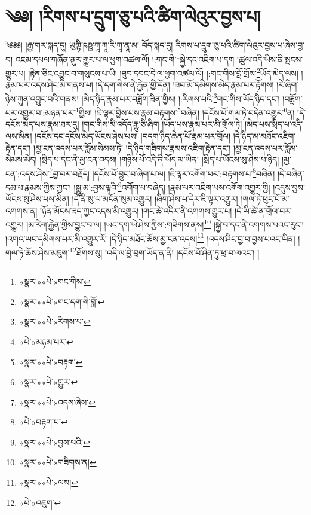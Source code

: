 \chapter{༄༅། །རིགས་པ་དྲུག་ཅུ་པའི་ཚིག་ལེའུར་བྱས་པ།}༄༅༅། །རྒྱ་གར་སྐད་དུ། ཡུགྟི་ཥཥྛ་ཀཱ་ཀཱ་རི་ཀཱ་ནཱ་མ། བོད་སྐད་དུ། རིགས་པ་དྲུག་ཅུ་པའི་ཚིག་ལེའུར་བྱས་པ་ཞེས་བྱ་བ། འཇམ་དཔལ་གཞོན་ནུར་གྱུར་པ་ལ་ཕྱག་འཚལ་ལོ། །:གང་གི་\footnote{«སྣར་»«པེ་»གང་གིས་}སྐྱེ་དང་འཇིག་པ་དག །ཚུལ་འདི་ཡིས་ནི་སྤངས་གྱུར་པ། །རྟེན་ཅིང་འབྱུང་བ་གསུངས་པ་ཡི། །ཐུབ་དབང་དེ་ལ་ཕྱག་འཚལ་ལོ། །:གང་གིས་བློ་གྲོས་\footnote{«སྣར་»«པེ་»གང་དག་གི་བློ་}ཡོད་མེད་ལས། །རྣམ་པར་འདས་ཤིང་མི་གནས་པ། །དེ་དག་གིས་ནི་རྐྱེན་གྱི་དོན། །ཟབ་མོ་དམིགས་མེད་རྣམ་པར་རྟོགས། །རེ་ཞིག་ཉེས་ཀུན་འབྱུང་བའི་གནས། །མེད་ཉིད་རྣམ་པར་བཟློག་ཟིན་གྱིས། །:རིགས་པའི་\footnote{«སྣར་»«པེ་»རིགས་པ་}གང་གིས་ཡོད་ཉིད་དང་། །བཟློག་པར་འགྱུར་བ་:མཉན་པར་\footnote{«པེ་»མཉམ་པར་}གྱིས། །ཇི་ལྟར་བྱིས་པས་རྣམ་བརྟགས་\footnote{«སྣར་»«པེ་»བརྟག་}བཞིན། །དངོས་པོ་གལ་ཏེ་བདེན་འགྱུར་\footnote{«སྣར་»«པེ་»གྱུར་}ན། །དེ་དངོས་མེད་པས་རྣམ་ཐར་དུ། །གང་གིས་མི་འདོད་རྒྱུ་ཅི་ཞིག །ཡོད་པས་རྣམ་པར་མི་གྲོལ་ཏེ། །མེད་པས་སྲིད་པ་འདི་ལས་མིན། །དངོས་དང་དངོས་མེད་ཡོངས་ཤེས་པས། །བདག་ཉིད་ཆེན་པོ་རྣམ་པར་གྲོལ། །དེ་ཉིད་མ་མཐོང་འཇིག་རྟེན་དང་། །མྱ་ངན་འདས་པར་རློམ་སེམས་ཏེ། །དེ་ཉིད་གཟིགས་རྣམས་འཇིག་རྟེན་དང་། །མྱ་ངན་འདས་པར་རློམ་སེམས་མེད། །སྲིད་པ་དང་ནི་མྱ་ངན་འདས། །གཉིས་པོ་འདི་ནི་ཡོད་མ་ཡིན། །སྲིད་པ་ཡོངས་སུ་ཤེས་པ་ཉིད། །མྱ་ངན་:འདས་ཤེས་\footnote{«སྣར་»«པེ་»འདས་ཞེས་}བྱ་བར་བརྗོད། །དངོས་པོ་བྱུང་བ་ཞིག་པ་ལ། །ཇི་ལྟར་འགོག་པར་:བརྟགས་པ་\footnote{«པེ་»བརྟག་པ་}བཞིན། །དེ་བཞིན་དམ་པ་རྣམས་ཀྱིས་ཀྱང་། །སྒྱུ་མ་:བྱས་ལྟའི་\footnote{«སྣར་»«པེ་»བྱས་པའི་}འགོག་པ་བཞེད། །རྣམ་པར་འཇིག་པས་འགོག་འགྱུར་གྱི། །འདུས་བྱས་ཡོངས་སུ་ཤེས་པས་མིན། །དེ་ནི་སུ་ལ་མངོན་སུམ་འགྱུར། །ཞིག་ཤེས་པ་དེར་ཇི་ལྟར་འགྱུར། །གལ་ཏེ་ཕུང་པོ་མ་འགགས་ན། །ཉོན་མོངས་ཟད་ཀྱང་འདས་མི་འགྱུར། །གང་ཚེ་འདིར་ནི་འགགས་གྱུར་པ། །དེ་ཡི་ཚེ་ན་གྲོལ་བར་འགྱུར། །མ་རིག་རྐྱེན་གྱིས་བྱུང་བ་ལ། །ཡང་དག་ཡེ་ཤེས་ཀྱིས་:གཟིགས་ནས།\footnote{«སྣར་»«པེ་»གཟིགས་ན།} །སྐྱེ་བ་དང་ནི་འགགས་པའང་རུང་། །འགའ་ཡང་དམིགས་པར་མི་འགྱུར་རོ། །དེ་ཉིད་མཐོང་ཆོས་མྱ་ངན་འདས།\footnote{«སྣར་»«པེ་»ལས།} །འདས་ཤིང་བྱ་བ་བྱས་པའང་ཡིན། །གལ་ཏེ་ཆོས་ཤེས་མཇུག་\footnote{«པེ་»འཇུག་}ཐོགས་སུ། །འདི་ལ་བྱེ་བྲག་ཡོད་ན་ནི། །དངོས་པོ་ཤིན་ཏུ་ཕྲ་བ་ལའང་། །

